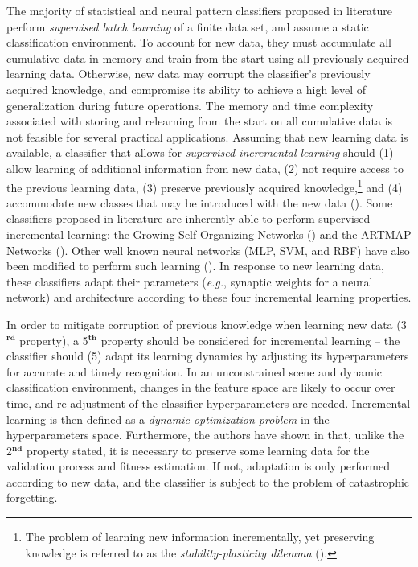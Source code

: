 The majority of statistical and neural pattern classifiers proposed in literature perform \emph{supervised batch learning} of a finite data set, and assume a static classification environment. To account for new data, they must accumulate all cumulative data in memory and train from the start using all previously acquired learning data. Otherwise, new data may corrupt the classifier's previously acquired knowledge, and compromise its ability to achieve a high level of generalization during future operations. The memory and time complexity associated with storing and relearning from the start on all cumulative data is not feasible for several practical applications. Assuming that new learning data is available, a classifier that allows for \emph{supervised incremental learning} should (1) allow learning of additional information from new data, (2) not require access to the previous learning data, (3) preserve previously acquired knowledge,\footnote{The problem of learning new information incrementally, yet preserving knowledge is referred to as the \emph{stability-plasticity dilemma} (\cite{carpenter87}).} and (4) accommodate new classes that may be introduced with the new data (\cite{polikar01}). Some classifiers proposed in literature are inherently able to perform supervised incremental learning: the Growing Self-Organizing Networks (\cite{fritzke96}) and the ARTMAP Networks (\cite{carpenter91}). Other well known neural networks (MLP, SVM, and RBF) have also been modified to perform such learning (\cite{chakraborty03, okamoto03, ruping01}). In response to new learning data, these classifiers adapt their parameters (\emph{e.g.}, synaptic weights for a neural network) and architecture according to these four incremental learning properties.

In order to mitigate corruption of previous knowledge when learning new data (3$^\mathbf{rd}$ property), a 5$^\mathbf{th}$ property should be considered for incremental learning -- the classifier should (5) adapt its learning dynamics by adjusting its hyperparameters for accurate and timely recognition. In an unconstrained scene and dynamic classification environment, changes in the feature space are likely to occur over time, and re-adjustment of the classifier hyperparameters are needed. Incremental learning is then defined as a \emph{dynamic optimization problem} in the hyperparameters space. Furthermore, the authors have shown in \cite{connolly09} that, unlike the 2$^\mathbf{nd}$ property stated, it is necessary to preserve some learning data for the validation process and fitness estimation. If not, adaptation is only performed according to new data, and the classifier is subject to the problem of catastrophic forgetting.

